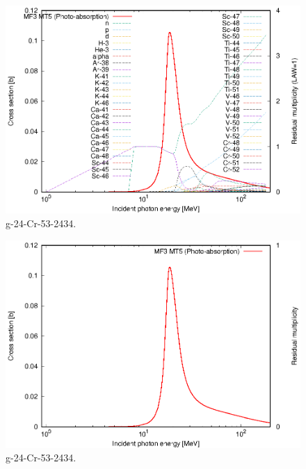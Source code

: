 \begin{figure}
 \includegraphics[width=\linewidth]{eps/g_24-Cr-53_2434.eps}
  \caption{g-24-Cr-53-2434.}
\end{figure}
\begin{figure}
 \includegraphics[width=\linewidth]{eps-law0/g_24-Cr-53_2434.eps}
 \caption{g-24-Cr-53-2434.}
\end{figure}
\newpage \clearpage

